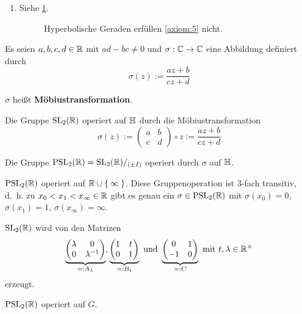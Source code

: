 \begin{beweis}
\begin{enumerate}[label=\alph*), ref=\theproposition (\alph*)]
        \item Siehe \cref{fig:hyperbolische-halbebene-axiom-5}.
            \begin{figure}[hp]
                \centering
                
                \caption{Hyperbolische Geraden erfüllen \ref{axiom:5} nicht.}
                \label{fig:hyperbolische-halbebene-axiom-5}
            \end{figure}
    \end{enumerate}
\end{beweis}

\begin{definition}%
    Es seien $a,b,c,d \in \mathbb{R}$ mit $ad - bc \neq 0$ und
    $\sigma: \mathbb{C} \rightarrow \mathbb{C}$ eine Abbildung definiert durch
    \[\sigma(z) := \frac{az + b}{cz+d}\]

    $\sigma$ heißt \textbf{Möbiustransformation}.
\end{definition}

\begin{proposition}%
    \begin{propenum}
        \item Die Gruppe $\mathrm{SL}_2(\mathbb{R})$ operiert auf $\mathbb{H}$ durch die Möbiustransformation
              \[\sigma(z):= \begin{pmatrix}a & b\\c & d\end{pmatrix} \circ z := \frac{az + b}{cz + d}\]
        \item Die Gruppe $\mathrm{PSL}_2(\mathbb{R}) = \mathrm{SL}_2(\mathbb{R}) /_{(\pm I)}$ operiert durch $\sigma$ auf $\mathbb{H}$.
        \item \label{prop:15.2c} $\mathrm{PSL}_2(\mathbb{R})$ operiert auf $\mathbb{R} \cup \Set{\infty}$.
              Diese Gruppenoperation ist 3-fach transitiv, d.~h. zu
              $x_0 < x_1 < x_\infty \in \mathbb{R}$ gibt es genau ein
              $\sigma \in \mathrm{PSL}_2(\mathbb{R})$ mit $\sigma(x_0) = 0$,
              $\sigma(x_1) = 1$, $\sigma(x_\infty) = \infty$.
        \item \label{prop:15.2d} $\mathrm{SL}_2(\mathbb{R})$ wird von den Matrizen
              \[\underbrace{\begin{pmatrix}\lambda & 0\\ 0 & \lambda^{-1}\end{pmatrix}}_{=: A_{\lambda}},
                \underbrace{\begin{pmatrix}1 & t\\ 0 & 1\end{pmatrix}}_{=: B_{t}} \text{ und }
                \underbrace{\begin{pmatrix}0 & 1\\-1 & 0\end{pmatrix}}_{=: C} \text{ mit } t, \lambda \in \mathbb{R}^\times\]
              erzeugt.
        \item \label{prop:15.2e} $\mathrm{PSL}_2(\mathbb{R})$ operiert auf $G$.
    \end{propenum}
\end{proposition}

